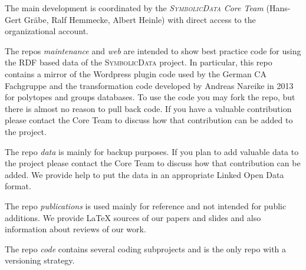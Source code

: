 \documentclass[a4paper,11pt]{article}
\def\SD{\textsc{SymbolicData}}
\begin{document}
The main development is coordinated by the \emph{{\SD} Core Team} (Hans-Gert
Gr\"abe, Ralf Hemmecke, Albert Heinle) with direct access to the organizational
account.

The repos \emph{maintenance} and \emph{web} are intended to show best practice
code for using the RDF based data of the {\SD} project.  In particular, this
repo contains a mirror of the Wordpress plugin code used by the German CA
Fachgruppe and the transformation code developed by Andreas Nareike in 2013 for
polytopes and groups databases.  To use the code you may fork the repo, but
there is almost no reason to pull back code. If you have a valuable
contribution please contact the Core Team to discuss how that contribution can
be added to the project.

The repo \emph{data} is mainly for backup purposes. If you plan to add valuable
data to the project please contact the Core Team to discuss how that
contribution can be added. We provide help to put the data in an appropriate
Linked Open Data format.

The repo \emph{publications} is used mainly for reference and not intended for
public additions. We provide {\LaTeX} sources of our papers and slides and also
information about reviews of our work.

The repo \emph{code} contains several coding subprojects and is the only repo
with a versioning strategy.
\end{document}
